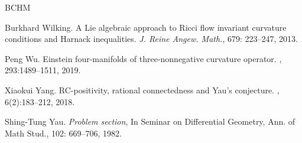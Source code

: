 \documentclass[12pt]{amsart}
\theoremstyle{plain}
\theoremstyle{definition}
\renewcommand{\>}{\rightarrow}
\numberwithin{equation}{section} %
\begin{document}
\begin{thebibliography}{BCHM}
	
	 Burkhard Wilking.
	A Lie algebraic approach to Ricci flow invariant curvature conditions and Harnack inequalities. {\emph{J. Reine Angew. Math.}}, 679: 223--247, 2013.
	
	Peng Wu.
	\newblock	Einstein four-manifolds of three-nonnegative curvature operator.
	, 293:1489--1511, 2019.
	
	
	
	Xiaokui Yang.
	\newblock RC-positivity, rational connectedness and Yau's conjecture.
	, 6(2):183--212, 2018.

		 Shing-Tung Yau.  \emph{Problem section}, In Seminar on Differential Geometry, Ann. of Math Stud., 102: 669--706,  1982.
	

	
\end{thebibliography}




	
\end{document}
